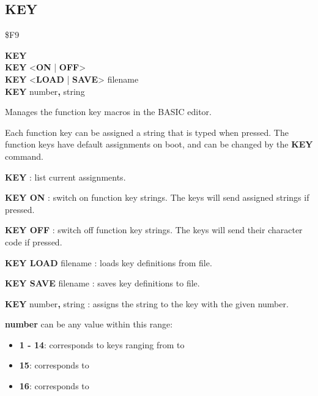 
\newpage
\subsection{KEY}
\begin{description}[leftmargin=2cm,style=nextline]
\item [Token:]    \$F9

\item [Format:]   {\bf KEY} \\
                  {\bf KEY} <{\bf ON} | {\bf OFF}> \\
                  {\bf KEY} <{\bf LOAD} | {\bf SAVE}> filename \\
                  {\bf KEY} number{\bf,} string

\item [Usage:]    Manages the function key macros in the BASIC editor.

                  Each function key can be assigned a string that is typed when pressed. The function keys have default assignments on boot, and can be changed by the {\bf KEY} command.

                  {\bf KEY} : list current assignments.

                  {\bf KEY ON} : switch on function key strings. The keys will send assigned strings if pressed.

                  {\bf KEY OFF} : switch off function key strings. The keys will send their character code if pressed.

                  {\bf KEY LOAD} filename : loads key definitions from file.

                  {\bf KEY SAVE} filename : saves key definitions to file.

                  {\bf KEY} number{\bf ,} string : assigns the string to the key with the given number.

                  {\bf number} can be any value within this range:

                  \begin{itemize}
                     \item {\bf 1 - 14}: corresponds to keys ranging from  to 
                     \item {\bf 15}: corresponds to 
                     \item {\bf 16}: corresponds to 
                  \end{itemize}


\end{description}
